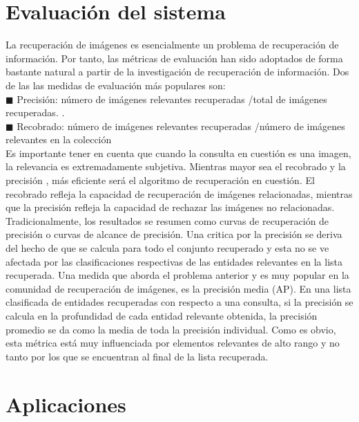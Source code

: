 \documentclass{llncs}
\begin{document}
\chapter*{Evaluación del sistema}


La recuperación de imágenes es esencialmente un problema de recuperación de información. Por tanto, 
las métricas de evaluación han sido adoptados de forma bastante natural a partir de la investigación de 
recuperación de información. Dos de las las medidas de evaluación más populares son:\\
$\blacksquare$ Precisión:  n\'umero de im\'agenes relevantes  recuperadas /total de im\'agenes recuperadas.
.\\
$\blacksquare$ Recobrado:  n\'umero de im\'agenes relevantes  recuperadas /n\'umero de im\'agenes relevantes en la colecci\'on\\

Es importante tener en cuenta que cuando la consulta en cuestión es una imagen, la relevancia es extremadamente subjetiva. 
Mientras mayor sea el recobrado y la precisi\'on , m\'as eficiente ser\'a el algoritmo de recuperaci\'on en cuesti\'on.
El recobrado refleja la capacidad de recuperaci\'on de im\'agenes relacionadas, mientras que la precisi\'on refleja la
capacidad de rechazar las im\'agenes no relacionadas.
Tradicionalmente, los resultados se resumen como curvas de recuperación de precisión o curvas de alcance de precisión. 
Una critica por la precisión se deriva del hecho de que se calcula para todo el conjunto recuperado y esta no se ve afectada 
por las clasificaciones respectivas de las entidades relevantes en la lista recuperada. Una medida que aborda el problema 
anterior y es muy popular en la comunidad de recuperación de imágenes, es la precisión media (AP). En una lista clasificada 
de entidades recuperadas con respecto a una consulta, si la precisión se calcula en la profundidad de cada entidad relevante 
obtenida, la precisión promedio se da como la media de toda la precisión individual. Como es obvio, esta métrica está muy 
influenciada por elementos relevantes de alto rango y no tanto por los que se encuentran al final de la lista recuperada.


\chapter*{Aplicaciones}
\end{document}
